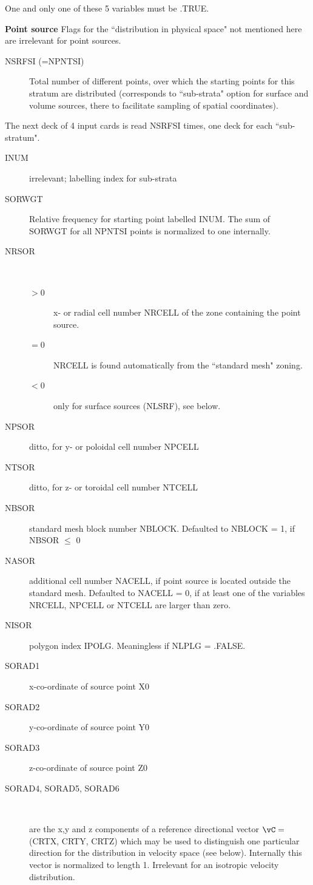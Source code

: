 One and only one of these 5 variables must be .TRUE.

\medskip

\textcolor[rgb]{0.00,0.00,1.00}{\textbf{Point source}}
Flags for the ``distribution in physical space" not mentioned here are
irrelevant for point sources.
\begin{description}
  \item[NSRFSI (=NPNTSI)] Total number of different points, over which the
        starting points for this stratum are distributed (corresponds to ``sub-strata"
        option for surface and volume sources, there to facilitate sampling of spatial
        coordinates).
\end{description}
The next deck of 4 input cards is read NSRFSI times, one deck for each
``sub-stratum".
\begin{description}
  \item[INUM] irrelevant; labelling index for sub-strata
  \item[SORWGT] Relative
        frequency for starting point labelled INUM.
        The sum of SORWGT for all NPNTSI points is normalized to one internally.
  \item[NRSOR] ~ 

        \begin{description}
          \item[$> 0$] x- or radial cell number NRCELL of the zone
                containing the point source.
          \item[$= 0$] NRCELL is found automatically from the ``standard mesh" zoning.
          \item[$< 0$] only for surface sources (NLSRF), see below.
        \end{description}
  \item[NPSOR] ditto, for y- or poloidal cell number NPCELL
  \item[NTSOR] ditto,
        for z- or toroidal cell number NTCELL
  \item[NBSOR] standard mesh block number
        NBLOCK.
        Defaulted to NBLOCK = 1, if NBSOR $\le$ 0
  \item[NASOR] additional cell number
        NACELL, if point source is located outside the standard mesh.
        Defaulted to NACELL = 0, if at least one of the variables NRCELL, NPCELL or
        NTCELL are larger than zero.
  \item[NISOR] polygon index IPOLG.
        Meaningless if NLPLG = .FALSE.
  \item[SORAD1] x-co-ordinate of source point X0
  \item[SORAD2] y-co-ordinate of
        source point Y0
  \item[SORAD3] z-co-ordinate of source point Z0
  \item[SORAD4,
        SORAD5, SORAD6] ~ 

        are the x,y and z components of a reference directional vector $\vC =$ (CRTX,
        CRTY, CRTZ) which may be used to distinguish one particular direction for the
        distribution in velocity space (see below).
        Internally this vector is normalized to length 1.
        Irrelevant for an isotropic velocity distribution.
\end{description}

